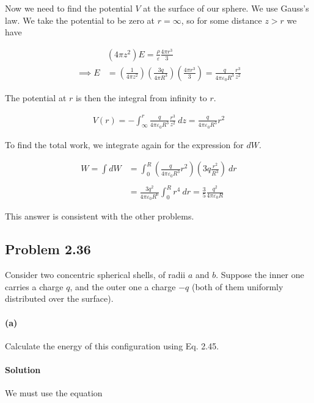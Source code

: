 \documentclass{article}
\begin{document}
Now we need to find the potential $V$ at the surface of our sphere. We use Gauss's law. We take the potential to be zero at $r = \infty$, so for some distance $z > r$ we have 

\begin{align*}
   &(4\pi z^2) E = \frac{\rho}{\varepsilon}\frac{4\pi r^3}{3} \\ 
   \implies E &= \left(\frac{1}{4\pi z^2}\right) \left(\frac{3q}{4\pi R^3}\right)\left(\frac{4\pi r^3}{3} \right) = \frac{q}{4\pi\varepsilon_0R^3}\frac{r^3}{z^2}
\end{align*}

The potential at $r$ is then the integral from infinity to $r$. 

\begin{align*}
    V(r) = -\int_{\infty}^{r} \frac{q}{4\pi\varepsilon_0R^3}\frac{r^3}{z^2}\ dz = \frac{q}{4\pi\varepsilon_0R^3}r^2
\end{align*}

To find the total work, we integrate again for the expression for $dW$.

\begin{align*}
    W = \int dW &= \int_0^R \left(\frac{q}{4\pi\varepsilon_0R^3}r^2\right)\left(3q\frac{r^2}{R^3}\right)\ dr \\
    \\
    &= \frac{3q^2}{4\pi\varepsilon_0R^6}\int_0^Rr^4\ dr = \frac{3}{5}\frac{q^2}{4\pi\varepsilon_0R}
\end{align*}

This answer is consistent with the other problems.

\newpage

\subsection*{Problem 2.36}  Consider two concentric spherical shells, of radii $a$ and $b$. Suppose the inner one carries a charge $q$, and the outer one a charge $-q$ (both of them uniformly distributed over the surface). 

\paragraph{(a)} Calculate the energy of this configuration using Eq. 2.45.

\paragraph{Solution} We must use the equation 
\end{document}
